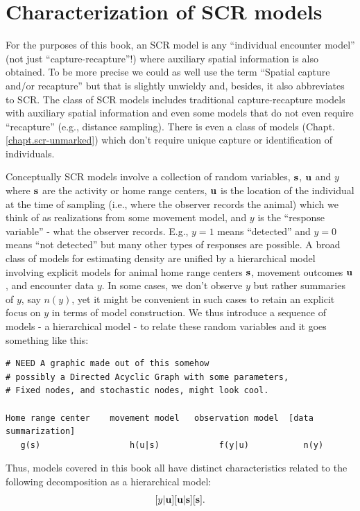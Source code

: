 \section{Characterization of SCR models}
\label{intro.sec.characterization}

For the purposes of this book, an SCR model is any ``individual
encounter model'' (not just ``capture-recapture''!) where auxiliary
spatial information is also obtained. To be more precise we could as
well use the term ``Spatial capture and/or recapture'' but that is
slightly unwieldy and, besides, it also abbreviates to SCR. The class
of SCR models includes traditional capture-recapture models with
auxiliary spatial information and even some
models that do not even require ``recapture'' (e.g., distance
sampling).  There is even a class of models (Chapt. \ref{chapt.scr-unmarked})
which don't require unique capture or
identification of individuals.

Conceptually SCR models involve a collection of random
variables, ${\bf s}$, ${\bf u}$ and $y$ where ${\bf s}$ are the
activity or home range centers, ${\bf u}$ is the location of the
individual at the time of sampling (i.e., where the observer records
the animal) which we think of as realizations from some movement
model, and $y$ is the ``response variable'' - what the observer
records. E.g., $y=1$ means ``detected'' and $y=0$ means ``not
detected'' but many other types of responses are possible.
A broad class of models for estimating density are unified by a
hierarchical model involving explicit models for
animal home range centers ${\bf s}$, movement outcomes ${\bf u}$, and
encounter data $y$.  In some cases, we don't observe $y$ but rather
summaries of $y$, say $n(y)$, yet it might be convenient in such cases
to retain an explicit focus on $y$ in terms of model construction.
We thus introduce a sequence of models - a hierarchical model -
to relate these random variables and it goes something like this:
{\small
\begin{verbatim}
# NEED A graphic made out of this somehow
# possibly a Directed Acyclic Graph with some parameters,
# Fixed nodes, and stochastic nodes, might look cool.

Home range center    movement model   observation model  [data summarization]
   g(s)                  h(u|s)            f(y|u)	        n(y)
\end{verbatim}
}
Thus, models covered in this book all have distinct
characteristics related to the following decomposition as a
hierarchical model:
\[
[y|{\bf u}][{\bf u}|{\bf s}][{\bf s}].
\]

